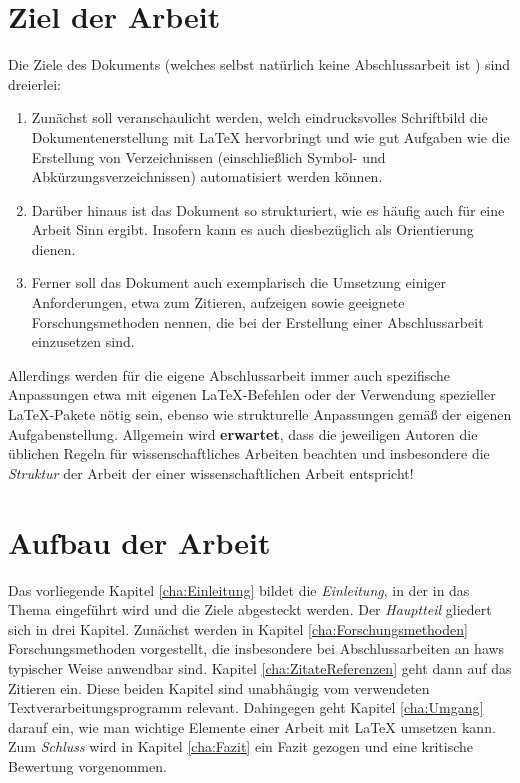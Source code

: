 \section{Ziel der Arbeit}
\label{sec:Einl-Ziel}
%
Die Ziele des Dokuments (welches selbst natürlich keine Abschlussarbeit ist \smiley) sind dreierlei:
%
\begin{enumerate}
\item Zunächst soll veranschaulicht werden, welch eindrucksvolles Schriftbild die Dokumentenerstellung mit
  \LaTeX{} hervorbringt und wie gut Aufgaben wie die Erstellung von Verzeichnissen (einschließlich Symbol-
  und Abkürzungsverzeichnissen) automatisiert werden können.
\item Darüber hinaus ist das Dokument so strukturiert, wie es häufig auch für eine Arbeit Sinn ergibt.
  Insofern kann es auch diesbezüglich als Orientierung dienen.
\item Ferner soll das Dokument auch exemplarisch die Umsetzung einiger Anforderungen, etwa zum Zitieren,
  aufzeigen sowie geeignete Forschungsmethoden nennen, die bei der Erstellung einer Abschlussarbeit einzusetzen
  sind.
\end{enumerate}
%
Allerdings werden für die eigene Abschlussarbeit immer auch spezifische Anpassungen etwa mit eigenen
\LaTeX{}-Befehlen oder der Verwendung
spezieller \LaTeX{}-Pakete nötig sein, ebenso wie strukturelle Anpassungen gemäß der eigenen Aufgabenstellung.
Allgemein wird \textbf{erwartet}, dass die jeweiligen Autoren die üblichen Regeln für wissenschaftliches
Arbeiten beachten und insbesondere die \emph{Struktur} der Arbeit der einer wissenschaftlichen Arbeit
entspricht!

\section{Aufbau der Arbeit}
\label{sec:Einl-Aufbau}
%
Das vorliegende Kapitel \ref{cha:Einleitung} bildet die \emph{Einleitung}, in der in das Thema eingeführt
wird und die Ziele abgesteckt werden.
Der \emph{Hauptteil} gliedert sich in drei Kapitel. Zunächst
werden in Kapitel \ref{cha:Forschungsmethoden} Forschungsmethoden vorgestellt, die insbesondere bei
Abschlussarbeiten an \glspl{haw} typischer Weise anwendbar sind. Kapitel \ref{cha:ZitateReferenzen} geht
dann auf das Zitieren ein. Diese beiden Kapitel sind unabhängig vom verwendeten Textverarbeitungsprogramm
relevant. Dahingegen geht  Kapitel \ref{cha:Umgang} darauf ein, wie man wichtige Elemente einer Arbeit mit
\LaTeX{} umsetzen kann. Zum \emph{Schluss} wird in Kapitel \ref{cha:Fazit} ein Fazit gezogen und eine kritische
Bewertung vorgenommen.

